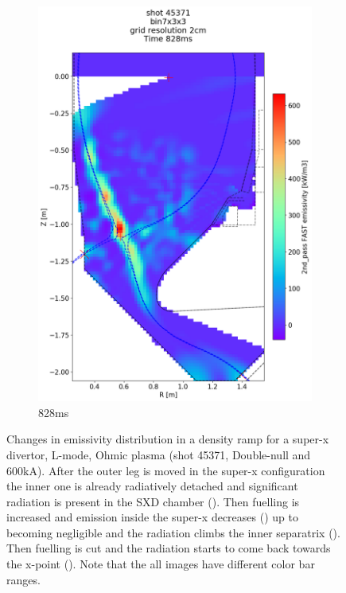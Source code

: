 \begin{figure}
\begin{subfigure}{0.395\linewidth}
         \includegraphics[trim={75 40 0 190},clip,width=\textwidth]{Chapters/chapter2/figs/IRVB-MASTU_shot-45371_export_11.png}
         \vspace*{-6.5mm}
         \caption{828ms}
         \label{fig:45371_export2_4}
     \end{subfigure}
    \vspace*{-3mm}
    \caption{Changes in emissivity distribution in a density ramp for a super-x divertor, L-mode, Ohmic plasma (shot 45371, Double-null and 600kA). After the outer leg is moved in the super-x configuration the inner one is already radiatively detached and significant radiation is present in the SXD chamber (). Then fuelling is increased and emission inside the super-x decreases () up to becoming negligible and the radiation climbs the inner separatrix (). Then fuelling is cut and the radiation starts to come back towards the x-point (). Note that the all images have different color bar ranges.}
    \label{fig:45371_export2}
\end{figure}
